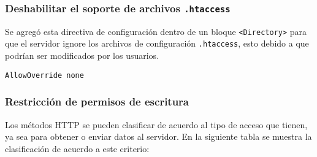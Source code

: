         \subsubsection{Deshabilitar el soporte de archivos \texttt{.htaccess}}

Se agreg\'{o} esta directiva de configuraci\'{o}n dentro de un bloque \texttt{<Directory>} para que el servidor ignore los archivos de configuraci\'{o}n \texttt{.htaccess}, esto debido a que podr\'{i}an ser modificados por los usuarios.

{
\scriptsize
\linespread{1}
\begin{verbatim}
AllowOverride none
\end{verbatim}
}

        \subsubsection{Restricci\'{o}n de permisos de escritura}

Los m\'{e}todos \textsc{\gls{HTTP}} se pueden clasificar de acuerdo al tipo de acceso que tienen, ya sea para obtener o enviar datos al servidor. En la siguiente tabla se muestra la clasificaci\'{o}n de acuerdo a este criterio:

{
 \linespread{1}
 \begin{table}[H]
 \caption{Clasificaci\'{o}n de m\'{e}todos \textsc{HTTP}}{}
 \label{tab:http-methods}
 \noindent{} %
 \end{table}
}

